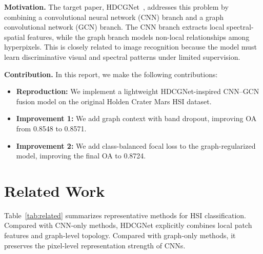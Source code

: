 \documentclass[conference]{IEEEtran}
\begin{document}
\noindent\textbf{Motivation.}
The target paper, HDCGNet~\cite{original_paper}, addresses this problem by combining a convolutional neural network (CNN) branch and a graph convolutional network (GCN) branch. The CNN branch extracts local spectral-spatial features, while the graph branch models non-local relationships among hyperpixels. This is closely related to image recognition because the model must learn discriminative visual and spectral patterns under limited supervision.

\noindent\textbf{Contribution.}
In this report, we make the following contributions:
\begin{itemize}
    \item \textbf{Reproduction:} We implement a lightweight HDCGNet-inspired CNN--GCN fusion model on the original Holden Crater Mars HSI dataset.
    \item \textbf{Improvement 1:} We add graph context with band dropout, improving OA from 0.8548 to 0.8571.
    \item \textbf{Improvement 2:} We add class-balanced focal loss to the graph-regularized model, improving the final OA to 0.8724.
\end{itemize}

\section{Related Work}
Table~\ref{tab:related} summarizes representative methods for HSI classification. Compared with CNN-only methods, HDCGNet explicitly combines local patch features and graph-level topology. Compared with graph-only methods, it preserves the pixel-level representation strength of CNNs.
\end{document}
